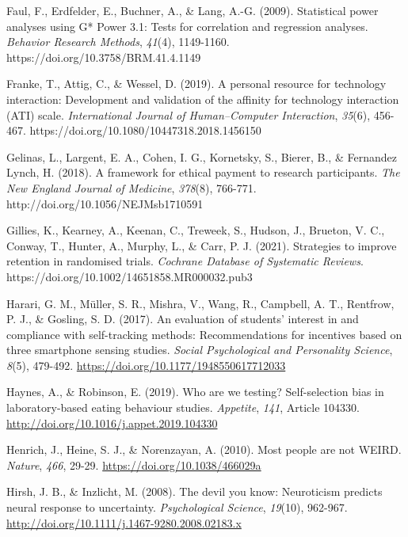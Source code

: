 \documentclass[authordate, empirical]{jote-new-article}
\begin{document}
	Faul, F., Erdfelder, E., Buchner, A., \& Lang, A.-G. (2009). Statistical power analyses using G* Power 3.1: Tests for correlation and regression analyses. \emph{Behavior Research Methods},\emph{ 41}(4), 1149-1160. https://doi.org/10.3758/BRM.41.4.1149



	Franke, T., Attig, C., \& Wessel, D. (2019). A personal resource for technology interaction: Development and validation of the affinity for technology interaction (ATI) scale. \emph{International Journal of Human--Computer Interaction},\emph{ 35}(6), 456-467. https://doi.org/10.1080/10447318.2018.1456150



	Gelinas, L., Largent, E. A., Cohen, I. G., Kornetsky, S., Bierer, B., \& Fernandez Lynch, H. (2018). A framework for ethical payment to research participants. \emph{The New England Journal of Medicine},\emph{ 378}(8), 766-771. http://doi.org/10.1056/NEJMsb1710591



	Gillies, K., Kearney, A., Keenan, C., Treweek, S., Hudson, J., Brueton, V. C., Conway, T., Hunter, A., Murphy, L., \& Carr, P. J. (2021). Strategies to improve retention in randomised trials. \emph{Cochrane Database of Systematic Reviews}. https://doi.org/10.1002/14651858.MR000032.pub3



	Harari, G. M., Müller, S. R., Mishra, V., Wang, R., Campbell, A. T., Rentfrow, P. J., \& Gosling, S. D. (2017). An evaluation of students' interest in and compliance with self-tracking methods: Recommendations for incentives based on three smartphone sensing studies. \emph{Social Psychological and Personality Science},\emph{ 8}(5), 479-492. \href{https://doi.org/10.1177/1948550617712033}{https://doi.org/10.1177/1948550617712033}



	Haynes, A., \& Robinson, E. (2019). Who are we testing? Self-selection bias in laboratory-based eating behaviour studies. \emph{Appetite},\emph{ 141}, Article 104330. \href{http://doi.org/10.1016/j.appet.2019.104330}{http://doi.org/10.1016/j.appet.2019.104330}



	Henrich, J., Heine, S. J., \& Norenzayan, A. (2010). Most people are not WEIRD. \emph{Nature},\emph{ 466}, 29-29. \href{https://doi.org/10.1038/466029a}{https://doi.org/10.1038/466029a}



	Hirsh, J. B., \& Inzlicht, M. (2008). The devil you know: Neuroticism predicts neural response to uncertainty. \emph{Psychological Science},\emph{ 19}(10), 962-967. \href{http://doi.org/10.1111/j.1467-9280.2008.02183.x}{http://doi.org/10.1111/j.1467-9280.2008.02183.x}
\end{document}
